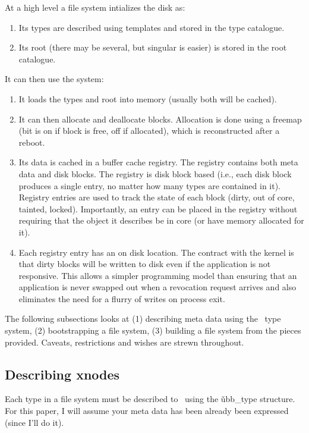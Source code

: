 At a high level a file system intializes the disk as:
\begin{enumerate}
	\item Its types are described using templates and stored in the
	type catalogue.

	\item  Its root (there may be several, but singular is
	easier) is stored in the root catalogue.  

\end{enumerate}

It can then use the system:
\begin{enumerate}
	\item It loads the types and root into memory (usually both
	will be cached).

	\item It can then allocate and deallocate blocks.  Allocation
	is done using a freemap (bit is on if block is free, off if
	allocated), which is reconstructed after a reboot.

	\item Its data is cached in a buffer cache registry.  The
	registry contains both meta data and disk blocks.  The registry
	is disk block based (i.e., each disk block produces a single
	entry, no matter how many types are contained in it).  Registry
	entries are used to track the state of each block (dirty, out
	of core, tainted, locked).  Importantly, an entry can be placed
	in the registry without requiring that the object it describes
	be in core (or have memory allocated for it).

	\item Each registry entry has an on disk location.  The
	contract with the kernel is that dirty blocks will be written
	to disk even if the application is not responsive.  This allows
	a simpler programming model than ensuring that an application
	is never swapped out when a revocation request arrives and also
	eliminates the need for a flurry of writes on process exit.
\end{enumerate}

The following subsections looks at (1) describing meta data using the
\xxx\ type system, (2) bootstrapping a file system, (3) building a file
system from the pieces provided.  Caveats, restrictions and wishes are 
strewn throughout.

\subsection{Describing xnodes}
Each type in a file system must be described to \xxx\ using the
\v{ubb\_type} structure.  For this paper, I will assume your meta data
has been already been expressed (since I'll do it).

